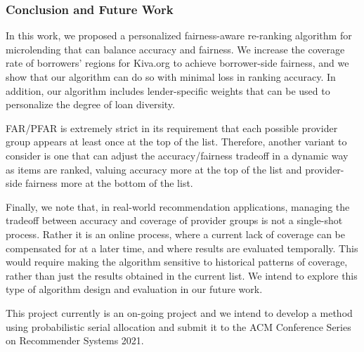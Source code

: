 \subsubsection{\textbf{Conclusion and Future Work}}\label{sect:conclusion}
In this work, we proposed a personalized fairness-aware re-ranking algorithm for microlending that can balance accuracy and fairness. We increase the coverage rate of borrowers' regions for Kiva.org to achieve borrower-side fairness, and we show that our algorithm can do so with minimal loss in ranking accuracy. In addition, our algorithm includes lender-specific weights that can be used to personalize the degree of loan diversity.



FAR/PFAR is extremely strict in its requirement that each possible provider group appears at least once at the top of the list. Therefore, another variant to consider is one that can adjust the accuracy/fairness tradeoff in a dynamic way as items are ranked, valuing accuracy more at the top of the list and provider-side fairness more at the bottom of the list.

Finally, we note that, in real-world recommendation applications, managing the tradeoff between accuracy and coverage of provider groups is not a single-shot process. Rather it is an online process, where a current lack of coverage can be compensated for at a later time, and where results are evaluated temporally. This would require making the algorithm sensitive to historical patterns of coverage, rather than just the results obtained in the current list. We intend to explore this type of algorithm design and evaluation in our future work.

This project currently is an on-going project and we intend to develop a method using probabilistic serial allocation and submit it to the ACM Conference Series on Recommender Systems 2021.

